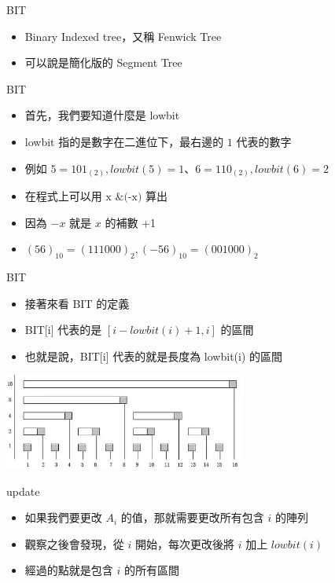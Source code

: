 \documentclass[aspectratio=169]{beamer}
\begin{document}
    \begin{frame}{BIT}
        \begin{itemize}
            \item Binary Indexed tree，又稱 Fenwick Tree
            \item 可以說是簡化版的 Segment Tree
        \end{itemize}
    \end{frame}

    \begin{frame}{BIT}
        \begin{itemize}
            \item 首先，我們要知道什麼是 lowbit
            \item lowbit 指的是數字在二進位下，最右邊的 $1$ 代表的數字
            \item 例如 $5 = 101_{(2)}, lowbit(5) = 1$、$6 = 110_{(2)}, lowbit(6) = 2$
            \item 在程式上可以用 $\text{x \& (-x)}$ 算出
            \item 因為 $-x$ 就是 $x$ 的補數 +1
            \item $
            (56)_{10} = (111000)_2,
            (-56)_{10} = (001000)_2$
        \end{itemize}
        
    \end{frame}

    \begin{frame}{BIT}
        \begin{itemize}
            \item 接著來看 BIT 的定義
            \item BIT[i] 代表的是 $[i - lowbit(i) + 1, i]$ 的區間
            \item 也就是說，BIT[i] 代表的就是長度為 lowbit(i) 的區間
        \end{itemize}

        \includegraphics[width=0.6\textwidth]{img/BIT.png}
    \end{frame}

    \begin{frame}{update}
        \begin{itemize}
            \item 如果我們要更改 $A_i$ 的值，那就需要更改所有包含 $i$ 的陣列
            \item 觀察之後會發現，從 $i$ 開始，每次更改後將 $i$ 加上 $lowbit(i)$
            \item 經過的點就是包含 $i$ 的所有區間
        \end{itemize}
    \end{frame}
\end{document}
